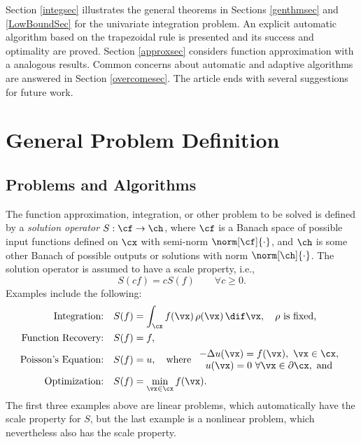 \documentclass[]{elsarticle}
\theoremstyle{definition}
\theoremstyle{remark}
\begin{document}
Section \ref{integsec} illustrates the general theorems in Sections \ref{genthmsec} and \ref{LowBoundSec} for the univariate integration problem.  An explicit automatic algorithm based on the trapezoidal rule is presented and its success and optimality are proved.  Section \ref{approxsec}  considers function approximation with a analogous results.  Common concerns about automatic and adaptive algorithms are answered in Section \ref{overcomesec}. The article ends with several suggestions for future work.

\section{General Problem Definition} \label{probdefsec}

\subsection{Problems and Algorithms} The function approximation, integration, or other problem to be solved is defined by a \emph{solution operator} $S:\cf \to \ch$, where $\cf$ is a Banach space of possible input functions defined on $\cx$ with semi-norm $\norm[\cf]{\cdot}$, and $\ch$ is some other Banach of possible outputs or solutions with norm $\norm[\ch]{\cdot}$. The solution operator is assumed to have a scale property, i.e., 
\[
S(cf) = cS(f) \qquad \forall c\ge 0.
\]
Examples include the following:
\begin{align*}
\text{Integration:} \quad & S(f) = \int_{\cx} f(\vx) \, \rho(\vx) \, \dif \vx, \quad \rho \text{ is fixed,}\\
\text{Function Recovery:} \quad & S(f) = f, \\
\text{Poisson's Equation:} \quad & S(f) = u, \quad \text{where } \begin{array}{c} -\Delta u(\vx) = f(\vx), \ \vx \in \cx, \\ u(\vx)=0 \ \forall \vx \in \partial \cx, \text{ and}\end{array} \\
\text{Optimization:} \quad & S(f) = \min_{\vx \in \cx} f(\vx).
\end{align*}
The first three examples above are linear problems, which automatically have the scale property for $S$, but the last example is a nonlinear problem, which nevertheless also has the scale property.
\end{document}
